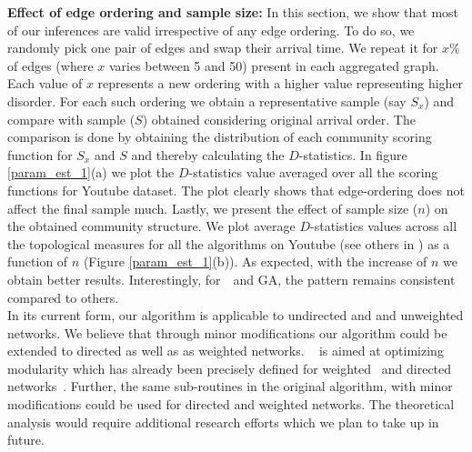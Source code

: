 {\bf Effect of edge ordering and sample size:}
In this section, we show that most of our inferences are valid irrespective of any edge ordering. To do so, we randomly pick one pair of edges and swap their arrival time. 
We repeat it for $x$\% of edges (where $x$ varies between 5 and 50) present in each aggregated graph. %
Each value of $x$ represents a new ordering with a higher 
value representing higher disorder. For each such ordering we obtain a representative sample (say $S_x$) and compare with sample ($S$) obtained considering original arrival 
order. The comparison is done by obtaining the distribution of each community scoring function for $S_x$ and $S$ and thereby calculating the $D$-statistics.  
In figure \ref{param_est_1}(a) we plot the $D$-statistics value averaged over all the scoring functions for Youtube dataset. 
The plot clearly shows that edge-ordering does not 
affect the final sample much. 
Lastly, we present the effect of sample size ($n$) on the obtained community structure. We plot average $D$-statistics values across all the topological measures for all the algorithms on Youtube  (see others in \cite{si}) as a function of $n$ (Figure \ref{param_est_1}(b)). As expected, with the increase of $n$ we obtain better results. Interestingly, for~\compas~and GA, the pattern remains consistent compared to others.\\


 In its current form, our algorithm is applicable to undirected and and unweighted networks. We believe that through minor modifications our algorithm could be extended to 
directed as well as as weighted networks. \compas~ is aimed at optimizing modularity which has already been precisely defined for weighted~\cite{newman2004analysis} and 
directed networks~\cite{leicht2008community}. Further, the same sub-routines in the original algorithm, with minor modifications could be used for directed and weighted networks. 
The theoretical analysis would require additional research efforts which we plan to take up in future.

